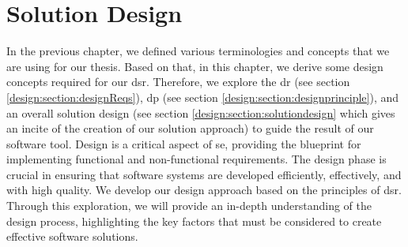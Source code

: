 
\chapter{Solution Design}
\label{chap:design}

\ifpdf
    \graphicspath{{Chapters/Design/Figs/}{Chapters/Design/Figs/}{Chapters/Design/Figs/}}
\else
    \graphicspath{{Chapters/Design/Figs/}{Chapters/Design/Figs/}}
\fi
In the previous chapter, we defined various terminologies and concepts that we are using for our thesis.
Based on that, in this chapter, we derive some design concepts required for our \ac{dsr}.
Therefore, we explore the \ac{dr} (see section \ref{design:section:designReqs}), \ac{dp} (see section \ref{design:section:designprinciple}), and an overall solution design (see section \ref{design:section:solutiondesign} which gives an incite of the creation of our solution approach) to guide the result of our software tool.
Design is a critical aspect of \ac{se}, providing the blueprint for implementing functional and non-functional requirements. 
The design phase is crucial in ensuring that software systems are developed efficiently, effectively, and with high quality. 
We develop our design approach based on the principles of \ac{dsr}. 
Through this exploration, we will provide an in-depth understanding of the design process, highlighting the key factors that must be considered to create effective software solutions.

